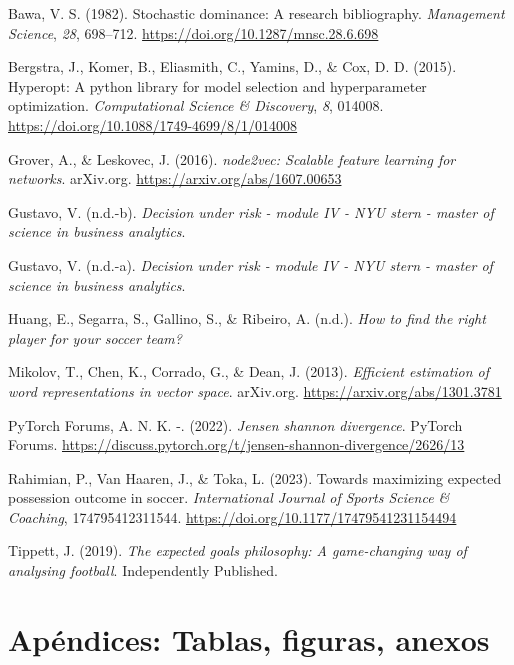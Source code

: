 \documentclass[
  a4paper,
]{article}
\newlength{\cslhangindent}
\newlength{\cslentryspacingunit} %
\newenvironment{CSLReferences}[2] %
 {%
  \setlength{\parindent}{0pt}
  \ifodd #1
  \let\oldpar\par
  \def\par{\hangindent=\cslhangindent\oldpar}
  \fi
  \setlength{\parskip}{#2\cslentryspacingunit}
 }%
 {}
\begin{document}
\hypertarget{refs}{}
\begin{CSLReferences}{1}{0}
\leavevmode{}%
Bawa, V. S. (1982). Stochastic dominance: A research bibliography.
\emph{Management Science}, \emph{28}, 698--712.
\url{https://doi.org/10.1287/mnsc.28.6.698}

\leavevmode{}%
Bergstra, J., Komer, B., Eliasmith, C., Yamins, D., \& Cox, D. D.
(2015). Hyperopt: A python library for model selection and
hyperparameter optimization. \emph{Computational Science \& Discovery},
\emph{8}, 014008. \url{https://doi.org/10.1088/1749-4699/8/1/014008}

\leavevmode{}%
Grover, A., \& Leskovec, J. (2016). \emph{node2vec: Scalable feature
learning for networks}. arXiv.org.
\url{https://arxiv.org/abs/1607.00653}

\leavevmode{}%
Gustavo, V. (n.d.-b). \emph{Decision under risk - module IV - NYU stern
- master of science in business analytics}.

\leavevmode{}%
Gustavo, V. (n.d.-a). \emph{Decision under risk - module IV - NYU stern
- master of science in business analytics}.

\leavevmode{}%
Huang, E., Segarra, S., Gallino, S., \& Ribeiro, A. (n.d.). \emph{How to
find the right player for your soccer team?}

\leavevmode{}%
Mikolov, T., Chen, K., Corrado, G., \& Dean, J. (2013). \emph{Efficient
estimation of word representations in vector space}. arXiv.org.
\url{https://arxiv.org/abs/1301.3781}

\leavevmode{}%
PyTorch Forums, A. N. K. -. (2022). \emph{Jensen shannon divergence}.
PyTorch Forums.
\url{https://discuss.pytorch.org/t/jensen-shannon-divergence/2626/13}

\leavevmode{}%
Rahimian, P., Van Haaren, J., \& Toka, L. (2023). Towards maximizing
expected possession outcome in soccer. \emph{International Journal of
Sports Science \& Coaching}, 174795412311544.
\url{https://doi.org/10.1177/17479541231154494}

\leavevmode{}%
Tippett, J. (2019). \emph{The expected goals philosophy: A game-changing
way of analysing football}. Independently Published.

\end{CSLReferences}

\hypertarget{apuxe9ndices}{%
\section{\texorpdfstring{\textbf{Apéndices: Tablas, figuras,
anexos}}{Apéndices: Tablas, figuras, anexos}}\label{apuxe9ndices}}

\listoffigures
\listoftables
{}
\end{document}
